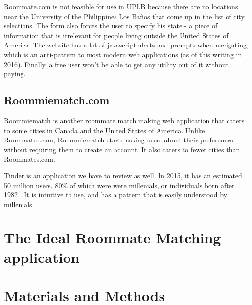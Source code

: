\documentclass[journal]{./IEEE/IEEEtran}
\newcommand{\UPLB}{University of the Philippines Los Ba\~{n}os }
\begin{document}
Roommate.com is not feasible for use in UPLB because there are no locations near the \UPLB that come up in the list of city selections. The form also forces the user to specify his state - a piece of information that is irrelevant for people living outside the United States of America. The website has a lot of javascript alerts and prompts when navigating, which is an anti-pattern to most modern web applications (as of this writing in 2016). Finally, a free user won't be able to get any utility out of it without paying.

\subsection{Roommiematch.com}
Roommiematch is another roommate match making web application that caters to some cities in Canada and the United States of America. Unlike Roommates.com, Roommiematch starts asking users about their preferences without requiring them to create an account. It also caters to fewer cities than Roommates.com.

Tinder is an application we have to review as well. In 2015, it has an estimated 50 million users\cite{tinderstat2}, 80\% of which were were millenials, or individuals born after 1982 \cite{tinderstat}\cite{millenial}. It is intuitive to use, and has a pattern that is easily understood by millenials.

\section{The Ideal Roommate Matching application}

\section{Materials and Methods}


\end{document}
